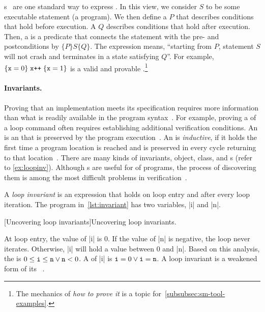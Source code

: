 s~\cite{hoare1969} are one standard way to express
. In this view, we consider \(S\) to be some executable
statement (a program). We then define a \emph{}
\(P\) that describes conditions that hold before execution. A
\emph{} \(Q\) describes conditions that hold
after execution. Then, a \emph{} is a predicate that connects
the statement with the pre- and postconditions by \(\{P\} S
\{Q\}\). The expression means, \enquote{starting from
\(P\), statement \(S\) will not crash and terminates in a state
satisfying \(Q\)}. For example, \(\{ \prm{x}=0
\}\;\prm{x++}\;\{\prm{x}=1\}\) is a valid and provable .\footnote{The mechanics of \emph{how to prove it} is a topic
for~\autoref{subsubsec:sm-tool-examples}.}

\paragraph*{Invariants.}
Proving that an implementation meets its specification requires more information
than what is readily available in the program syntax~\cite{chang2005}. For
example, proving a  of a loop command often requires
establishing additional verification conditions. An \emph{} is an
 that is preserved by the program execution~\cite{furia2014}. An
 is \emph{inductive}, if it holds the
first time a program location is reached and is preserved in every cycle
returning to that location~\cite{sankaranarayanan2004}. There are many kinds of
invariants, \eg object, class,
and s (refer to \autoref{ex:loopinv}). Although
s are useful for  of programs, the
process of discovering them is among the most difficult problems in
verification~\cite{dillig2013,yu2023}.

\begin{example}\label{ex:loopinv}
A \emph{loop invariant} is an expression that holds on loop entry and after
every loop iteration. The program in~\autoref{lst:invariant} has two variables,
\pr|i| and \pr|n|.

\begin{center}
\begin{minipage}{\textwidth}
\captionsetup{type=lstlisting}
[Uncovering loop invariants]{Uncovering loop invariants.}
\label{lst:invariant}
\end{minipage}
\end{center}

At loop entry, the value of \pr|i| is 0. If the value of \pr|n| is negative, the
loop never iterates. Otherwise, \pr|i| will hold a value between 0 and \pr|n|.
Based on this analysis, the  is \(0 \leq \prm{i} \leq
\prm{n} \vee \prm{n} < 0\). A  of \pr|i| is \(\prm{i}=0 \vee
\prm{i}=\prm{n}\). A loop invariant is a {weakened} form of its
~\cite{furia2010}.
\end{example}

